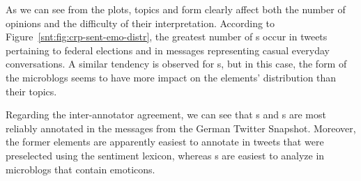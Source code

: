 As we can see from the plots, topics and form clearly affect both the
number of opinions and the difficulty of their interpretation.
According to Figure~\ref{snt:fig:crp-sent-emo-distr}, the greatest
number of s occur in tweets pertaining to federal
elections and in messages representing casual everyday conversations.
A similar tendency is observed for s, but in this
case, the form of the microblogs seems to have more impact on the
elements' distribution than their topics.


Regarding the inter-annotator agreement, we can see that
s and s are most reliably
annotated in the messages from the German Twitter Snapshot.  Moreover,
the former elements are apparently easiest to annotate in tweets that
were preselected using the sentiment lexicon, whereas s are easiest to analyze in microblogs that contain emoticons.

